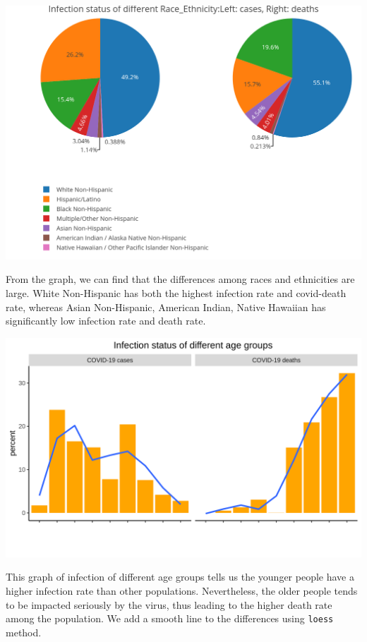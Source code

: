 \documentclass[
]{article}
\begin{document}
\begin{center}\includegraphics[width=1\linewidth]{race} \end{center}

From the graph, we can find that the differences among races and
ethnicities are large. White Non-Hispanic has both the highest infection
rate and covid-death rate, whereas Asian Non-Hispanic, American Indian,
Native Hawaiian has significantly low infection rate and death rate.

\begin{center}\includegraphics[width=1\linewidth]{age} \end{center}

This graph of infection of different age groups tells us the younger
people have a higher infection rate than other populations.
Nevertheless, the older people tends to be impacted seriously by the
virus, thus leading to the higher death rate among the population. We
add a smooth line to the differences using \texttt{loess} method.
\end{document}
